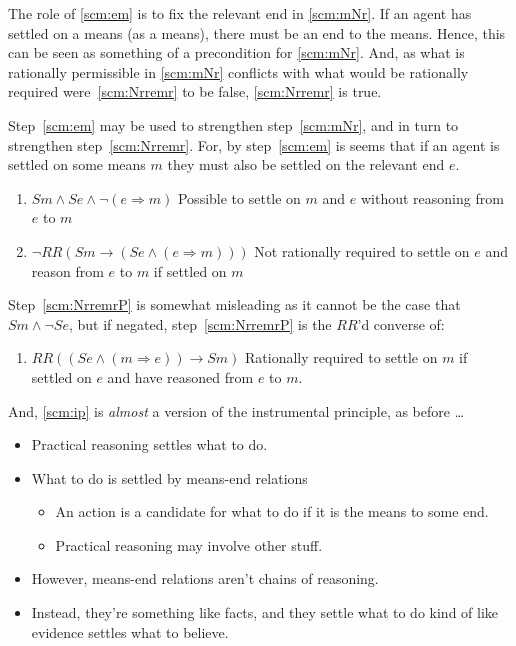 \documentclass[10pt]{article}
\newcommand{\hozline}[0]{%
  \noindent\hdashrule[0.5ex][c]{\textwidth}{.1pt}{}
}
\begin{document}
The role of \ref{scm:em} is to fix the relevant end in \ref{scm:mNr}.
If an agent has settled on a means (as a means), there must be an end to the means.
Hence, this can be seen as something of a precondition for \ref{scm:mNr}.
And, as what is rationally permissible in \ref{scm:mNr} conflicts with what would be rationally required were~\ref{scm:Nrremr} to be false, \ref{scm:Nrremr} is true.

Step~\ref{scm:em} may be used to strengthen step~\ref{scm:mNr}, and in turn to strengthen step~\ref{scm:Nrremr}.
For, by step~\ref{scm:em} is seems that if an agent is settled on some means \(m\) they must also be settled on the relevant end \(e\).

\begin{enumerate}[label=\arabic*\(^{+}\)., ref=(\arabic*\(^{+}\)), start=2]
\item \(Sm \land Se \land \lnot (e \Rightarrow m)\) \hfill Possible to settle on \(m\) and \(e\) without reasoning from \(e\) to \(m\)
\item\label{scm:NrremrP} \(\lnot RR(Sm \rightarrow (Se \land (e \Rightarrow m)))\) \hfill Not rationally required to settle on \(e\) and reason from \(e\) to \(m\) if settled on \(m\)
\end{enumerate}

\noindent Step~\ref{scm:NrremrP} is somewhat misleading as it cannot be the case that \(Sm \land \lnot Se\), but if negated, step~\ref{scm:NrremrP} is the \(RR\)'d converse of:

\begin{enumerate}[resume]
\item\label{scm:ip} \(RR((Se \land (m \Rightarrow e)) \rightarrow Sm)\) \hfill Rationally required to settle on \(m\) if settled on \(e\) and have reasoned from \(e\) to \(m\).
\end{enumerate}

\noindent And, \ref{scm:ip} is \emph{almost} a version of the instrumental principle, as before \dots

\hozline

\begin{itemize}
\item Practical reasoning settles what to do.
\item What to do is settled by means-end relations
  \begin{itemize}
  \item An action is a candidate for what to do if it is the means to some end.
  \item Practical reasoning may involve other stuff.
  \end{itemize}
\item However, means-end relations aren't chains of reasoning.
\item Instead, they're something like facts, and they settle what to do kind of like evidence settles what to believe.
\end{itemize}
\end{document}
